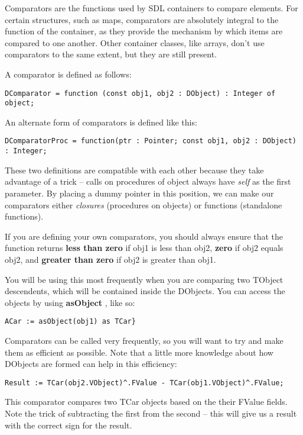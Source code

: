 \documentclass{report}
\begin{document}
Comparators are the functions used by SDL containers to compare elements.
For certain structures, such as maps, comparators are absolutely integral to
the function of the container, as they provide the mechanism by which items
are compared to one another. Other container classes, like arrays, don't use
comparators to the same extent, but they are still present.

A comparator is defined as follows:

\begin{lstlisting}
DComparator = function (const obj1, obj2 : DObject) : Integer of object;
\end{lstlisting}

An alternate form of comparators is defined like this:

\begin{lstlisting}
DComparatorProc = function(ptr : Pointer; const obj1, obj2 : DObject) : Integer;
\end{lstlisting}

These two definitions are compatible with each other because they take
advantage of a trick -- calls on procedures of object always have \emph{self
} as the first parameter. By placing a dummy pointer in this position, we
can make our comparators either \emph{closures} (procedures on objects) or
functions (standalone functions).

If you are defining your own comparators, you should always ensure 
that the function returns 
\textbf{less than zero} if obj1 is less than obj2, 
\textbf{zero} if obj2 equals obj2, and 
\textbf{greater than zero} if obj2 is greater than obj1.

You will be using this most frequently when you are comparing two TObject
descendents, which will be contained inside the DObjects. You can access the
objects by using \textbf{asObject} , like so:

\begin{lstlisting}
ACar := asObject(obj1) as TCar}
\end{lstlisting}

Comparators can be called very frequently, so you will want to try and make
them as efficient as possible. Note that a little more knowledge about how
DObjects are formed can help in this efficiency:

\begin{lstlisting}
Result := TCar(obj2.VObject)^.FValue - TCar(obj1.VObject)^.FValue;
\end{lstlisting}

This comparator compares two TCar objects based on the their FValue fields.
Note the trick of subtracting the first from the second -- this will give us
a result with the correct sign for the result.
\end{document}
